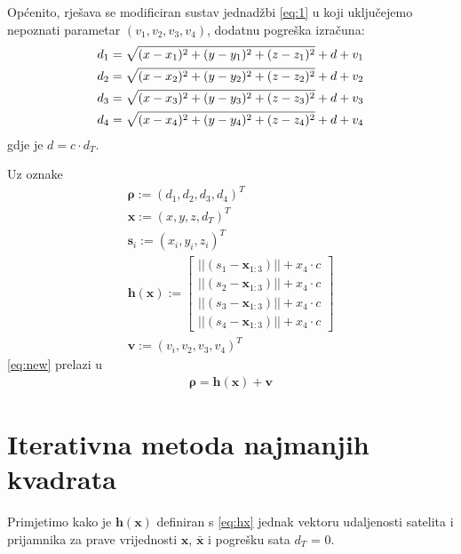 \documentclass[a4paper,twoside,12pt]{memoir} %
\begin{document}
Općenito, rješava se modificiran sustav jednadžbi \ref{eq:1} 
u koji uključejemo nepoznati parametar $(v_1,v_2,v_3,v_4)$, dodatnu pogreška
izračuna:
\begin{align}\label{eq:new}
d_1 = \sqrt{(x-x_1)^{2}+(y-y_1)^{2}+(z-z_1)^{2}} +d + v_1\notag \\
d_2 = \sqrt{(x-x_2)^{2}+(y-y_2)^{2}+(z-z_2)^{2}} +d + v_2 \\
d_3 = \sqrt{(x-x_3)^{2}+(y-y_3)^{2}+(z-z_3)^{2}} +d + v_3\notag \\
d_4 = \sqrt{(x-x_4)^{2}+(y-y_4)^{2}+(z-z_4)^{2}} +d + v_4\notag
\end{align}
gdje je $d = c \cdot d_T$.

Uz oznake 
\begin{align}
\mathbf{\rho} := (d_1, d_2, d_3, d_4)^T \\ 
\mathbf{x} := (x,y,z,d_T)^T \\ 
\mathbf{s}_i := (x_i,y_i,z_i)^T \\ 
\mathbf{h} (\mathbf{x}) := 
\begin{bmatrix}\label{eq:hx}
||(s_1-\mathbf{x}_{1:3})|| + x_4\cdot c\\
||(s_2-\mathbf{x}_{1:3})|| + x_4\cdot c\\
||(s_3-\mathbf{x}_{1:3})|| + x_4\cdot c\\
||(s_4-\mathbf{x}_{1:3})|| + x_4\cdot c
\end{bmatrix} \\
\mathbf{v} := (v_i,v_2,v_3,v_4)^T \label{eq:v}
\end{align}%
\ref{eq:new} prelazi u
\begin{align}\label{eq:matrix}
\mathbf{\rho} = \mathbf{h}(\mathbf{x})+\mathbf{v}
\end{align}%
\section{Iterativna metoda najmanjih kvadrata}

Primjetimo kako je $\mathbf{h}(\mathbf{x})$ definiran s \ref{eq:hx} jednak vektoru udaljenosti
satelita i prijamnika za prave vrijednosti $\mathbf{x}$, $\bar{\mathbf{x}}$ i pogrešku sata $d_T$ = 0.\\
\end{document}
